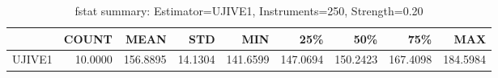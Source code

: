 \begin{table}[ht]
\centering
\caption{fstat summary: Estimator=UJIVE1, Instruments=250, Strength=0.20}
\begin{tabular}{lrrrrrrrr}
\toprule
 & COUNT & MEAN & STD & MIN & 25\% & 50\% & 75\% & MAX \\
\midrule
UJIVE1 & 10.0000 & 156.8895 & 14.1304 & 141.6599 & 147.0694 & 150.2423 & 167.4098 & 184.5984 \\
\bottomrule
\end{tabular}
\end{table}
